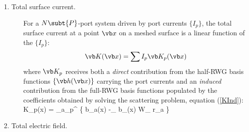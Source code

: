 \documentclass[letterpaper]{article}
\begin{document}
\begin{description}

\item[1. Total surface current.]

For a $N\subt{P}$-port system driven by port currents $\{I_p\}$,
the total surface current at a point $\vb x$ on a meshed surface
is a linear function of the $\{I_p\}$:
\begin{align*}
\vb K(\vb x) &= \sum I_p \vb K_p(\vb x)
\\
\end{align*}
where $\vb K_p$ receives both a \textit{direct} contribution from the
half-RWG basis functions $\{\vb h(\vb x)\}$ carrying the port currents
and an \textit{induced} contribution from the full-RWG basis
functions populated by the coefficients obtained by solving
the scattering problem, equation (\ref{KInd}):
{\vb K_p(\vb x) =
   \sum_{a\in{}_p^\pm}
   \pm {}
   \bigg\{  \vb b_a(\vb x)
           -\sum_{\alpha\beta} \vb b_\alpha(\vb x) W_{\alpha\beta} r_{\beta a}
   \bigg\}
}
\item[2. Total electric field.]


\end{description}
\end{document}
